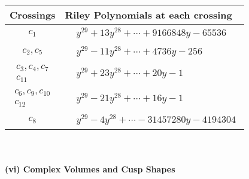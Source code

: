 \documentclass[1p]{elsarticle_modified}
\theoremstyle{definition}
\begin{document}
\begin{tabular}{m{50pt}|m{274pt}}
Crossings & \hspace{64pt}Riley Polynomials at each crossing \\
\hline $$\begin{aligned}c_{1}\end{aligned}$$&$\begin{aligned}
&y^{29}+13 y^{28}+\cdots+9166848 y-65536
\end{aligned}$\\
\hline $$\begin{aligned}c_{2},c_{5}\end{aligned}$$&$\begin{aligned}
&y^{29}-11 y^{28}+\cdots+4736 y-256
\end{aligned}$\\
\hline $$\begin{aligned}c_{3},c_{4},c_{7}\\c_{11}\end{aligned}$$&$\begin{aligned}
&y^{29}+23 y^{28}+\cdots+20 y-1
\end{aligned}$\\
\hline $$\begin{aligned}c_{6},c_{9},c_{10}\\c_{12}\end{aligned}$$&$\begin{aligned}
&y^{29}-21 y^{28}+\cdots+16 y-1
\end{aligned}$\\
\hline $$\begin{aligned}c_{8}\end{aligned}$$&$\begin{aligned}
&y^{29}-4 y^{28}+\cdots-31457280 y-4194304
\end{aligned}$\\
\hline
\end{tabular}\\~\\
\newpage\flushleft \textbf{(vi) Complex Volumes and Cusp Shapes}
\end{document}
